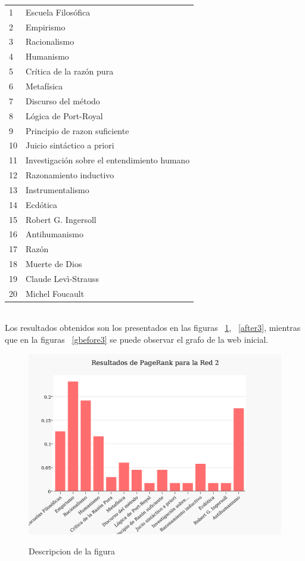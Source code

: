\documentclass[a4paper]{article}
\begin{document}
\begin{tabular}{l l}
1 & Escuela Filosófica \\
2 & Empirismo \\
3 & Racionalismo \\
4 & Humanismo \\
5 & Crítica de la razón pura \\
6 & Metafísica \\
7 & Discurso del método \\
8 & Lógica de Port-Royal \\
9 & Principio de razon suficiente \\
10 & Juicio sintáctico a priori \\
11 & Investigación sobre el entendimiento humano \\
12 & Razonamiento inductivo \\
13 & Instrumentalismo \\
14 & Ecdótica \\
15 & Robert G. Ingersoll \\
16 & Antihumanismo \\
17 & Razón \\
18 & Muerte de Dios \\
19 & Claude Levì-Strauss \\
20 & Michel Foucault \\
\end{tabular}\\

Los resultados obtenidos son los presentados en las figuras ~\ref{before3}, ~\ref{after3}, mientras que en la figuras ~\ref{gbefore3} se puede observar el grafo de la web inicial.

\begin{figure}
  \begin{center}
	\includegraphics[scale=0.80]{imagenes/Exp3/before}
	\label{before3}
	\caption{Descripcion de la figura}
  \end{center}
\end{figure}
\end{document}
